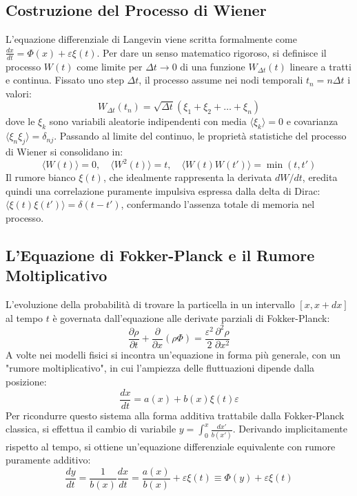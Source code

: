 \documentclass[12pt,a4paper]{article}
\begin{document}
\subsection{Costruzione del Processo di Wiener}
L'equazione differenziale di Langevin viene scritta formalmente come $\frac{dx}{dt} = \Phi(x) + \varepsilon \xi(t)$. Per dare un senso matematico rigoroso, si definisce il processo $W(t)$ come limite per $\Delta t \to 0$ di una funzione $W_{\Delta t}(t)$ lineare a tratti e continua. Fissato uno step $\Delta t$, il processo assume nei nodi temporali $t_n = n\Delta t$ i valori:
\begin{equation}
W_{\Delta t}(t_n) = \sqrt{\Delta t} (\xi_1 + \xi_2 + \dots + \xi_n)
\end{equation}
dove le $\xi_k$ sono variabili aleatorie indipendenti con media $\langle \xi_k \rangle = 0$ e covarianza $\langle \xi_n \xi_j \rangle = \delta_{nj}$. 
Passando al limite del continuo, le proprietà statistiche del processo di Wiener si consolidano in:
\begin{equation}
\langle W(t) \rangle = 0, \quad \langle W^2(t) \rangle = t, \quad \langle W(t)W(t') \rangle = \min(t, t')
\end{equation}
Il rumore bianco $\xi(t)$, che idealmente rappresenta la derivata $dW/dt$, eredita quindi una correlazione puramente impulsiva espressa dalla delta di Dirac: $\langle \xi(t)\xi(t') \rangle = \delta(t-t')$, confermando l'assenza totale di memoria nel processo.

\subsection{L'Equazione di Fokker-Planck e il Rumore Moltiplicativo}
L'evoluzione della probabilità di trovare la particella in un intervallo $[x, x+dx]$ al tempo $t$ è governata dall'equazione alle derivate parziali di Fokker-Planck:
\begin{equation}
\frac{\partial \rho}{\partial t} + \frac{\partial}{\partial x} (\rho \Phi) = \frac{\varepsilon^2}{2} \frac{\partial^2 \rho}{\partial x^2}
\end{equation}
A volte nei modelli fisici si incontra un'equazione in forma più generale, con un "rumore moltiplicativo", in cui l'ampiezza delle fluttuazioni dipende dalla posizione:
\begin{equation}
\frac{dx}{dt} = a(x) + b(x)\xi(t)\varepsilon
\end{equation}
Per ricondurre questo sistema alla forma additiva trattabile dalla Fokker-Planck classica, si effettua il cambio di variabile $y = \int_0^x \frac{dx'}{b(x')}$. Derivando implicitamente rispetto al tempo, si ottiene un'equazione differenziale equivalente con rumore puramente additivo:
\begin{equation}
\frac{dy}{dt} = \frac{1}{b(x)}\frac{dx}{dt} = \frac{a(x)}{b(x)} + \varepsilon \xi(t) \equiv \Phi(y) + \varepsilon \xi(t)
\end{equation}
\end{document}
